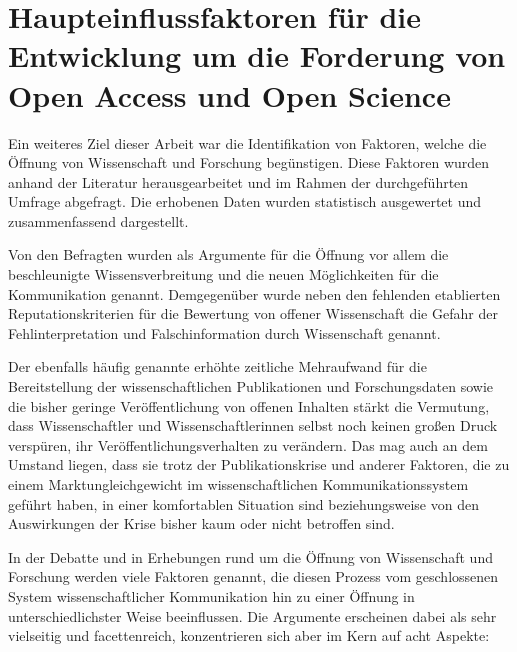 \section{Haupteinflussfaktoren für die Entwicklung um die Forderung von Open Access und Open Science}

Ein weiteres Ziel dieser Arbeit war die Identifikation von Faktoren, welche die Öffnung von Wissenschaft und Forschung begünstigen. Diese Faktoren wurden anhand der Literatur herausgearbeitet und im Rahmen der durchgeführten Umfrage abgefragt. Die erhobenen Daten wurden statistisch ausgewertet und zusammenfassend dargestellt.

Von den Befragten wurden als Argumente für die Öffnung vor allem die beschleunigte Wissensverbreitung und die neuen Möglichkeiten für die Kommunikation genannt. Demgegenüber wurde neben den fehlenden etablierten Reputationskriterien für die Bewertung von offener Wissenschaft die Gefahr der Fehlinterpretation und Falschinformation durch Wissenschaft genannt.

Der ebenfalls häufig genannte erhöhte zeitliche Mehraufwand für die Bereitstellung der wissenschaftlichen Publikationen und Forschungsdaten sowie die bisher geringe Veröffentlichung von offenen Inhalten stärkt die Vermutung, dass Wissenschaftler und Wissenschaftlerinnen selbst noch keinen großen Druck verspüren, ihr Veröffentlichungsverhalten zu verändern. Das mag auch an dem Umstand liegen, dass sie trotz der Publikationskrise und anderer Faktoren, die zu einem Marktungleichgewicht im wissenschaftlichen Kommunikationssystem geführt haben, in einer komfortablen Situation sind beziehungsweise von den Auswirkungen der Krise bisher kaum oder nicht betroffen sind.

In der Debatte und in Erhebungen rund um die Öffnung von Wissenschaft und Forschung werden viele Faktoren genannt, die diesen Prozess vom geschlossenen System wissenschaftlicher Kommunikation hin zu einer Öffnung in unterschiedlichster Weise beeinflussen. Die Argumente erscheinen dabei als sehr vielseitig und facettenreich, konzentrieren sich aber im Kern auf acht Aspekte:

